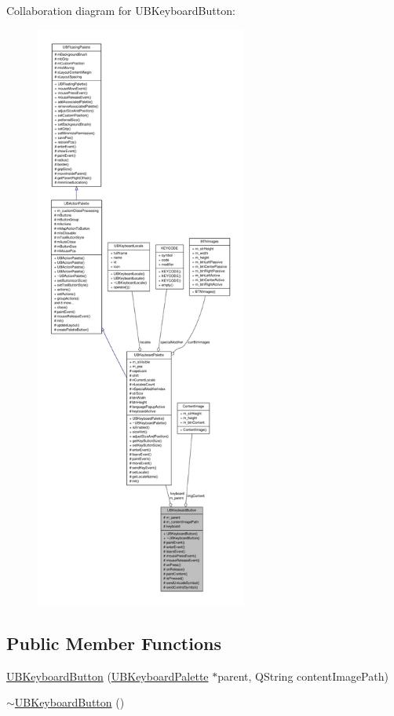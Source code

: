 Collaboration diagram for U\-B\-Keyboard\-Button\-:
\nopagebreak
\begin{figure}[H]
\begin{center}
\leavevmode
\includegraphics[height=550pt]{d0/d0f/class_u_b_keyboard_button__coll__graph}
\end{center}
\end{figure}
\subsection*{Public Member Functions}
\begin{DoxyCompactItemize}
\item 
\hyperlink{class_u_b_keyboard_button_ab1f5c4db91f193fdf65402a0a23aa819}{U\-B\-Keyboard\-Button} (\hyperlink{class_u_b_keyboard_palette}{U\-B\-Keyboard\-Palette} $\ast$parent, Q\-String content\-Image\-Path)
\item 
\hyperlink{class_u_b_keyboard_button_abef98b79988bfea57a24c87c2886db49}{$\sim$\-U\-B\-Keyboard\-Button} ()
\end{DoxyCompactItemize}
